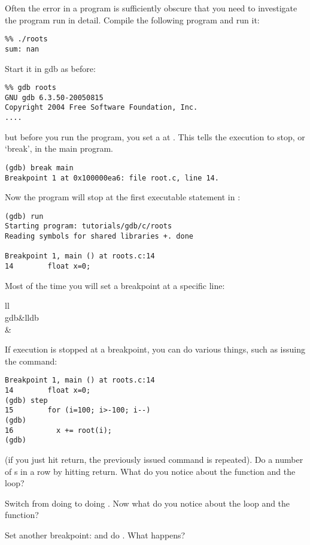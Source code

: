 Often the error in a program is sufficiently obscure that you need to
investigate the program run in detail. Compile the following program
%
%
and run it:
\begin{verbatim}
%% ./roots
sum: nan
\end{verbatim}
Start it in gdb as before:
\begin{verbatim}
%% gdb roots
GNU gdb 6.3.50-20050815 
Copyright 2004 Free Software Foundation, Inc.
....
\end{verbatim}
but before you run the program, you set a 
at .
This tells the execution to stop, or `break', in the main program.
\begin{verbatim}
(gdb) break main
Breakpoint 1 at 0x100000ea6: file root.c, line 14.
\end{verbatim}
Now the program will stop at the first executable statement in :
\begin{verbatim}
(gdb) run
Starting program: tutorials/gdb/c/roots
Reading symbols for shared libraries +. done

Breakpoint 1, main () at roots.c:14
14        float x=0;
\end{verbatim}

Most of the time you will set a breakpoint at a specific line:

\begin{fntable}{ll}
  \\
  \midrule
  gdb&lldb\\
  &\\
\end{fntable}

If execution is stopped at a breakpoint, you can do various things,
such as issuing the  command:
\begin{verbatim}
Breakpoint 1, main () at roots.c:14
14        float x=0;
(gdb) step
15        for (i=100; i>-100; i--)
(gdb) 
16          x += root(i);
(gdb) 
\end{verbatim}
(if you just hit return, the previously issued command is
repeated). Do a number of s in a row by hitting return. What
do you notice about the function and the loop?

Switch from doing  to doing . Now what do you notice
about the loop and the function? 

Set another breakpoint:  and do . What happens?


